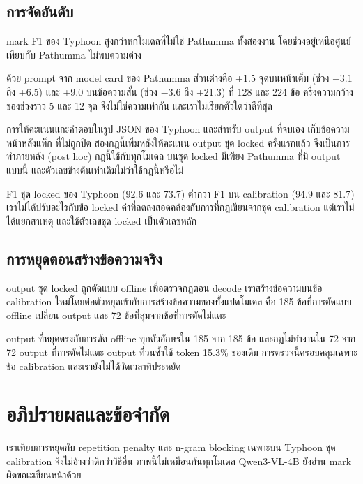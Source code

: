 \subsection{การจัดอันดับ}
mark F1 ของ Typhoon สูงกว่าหกโมเดลที่ไม่ใช่ Pathumma ทั้งสองงาน โดยช่วงอยู่เหนือศูนย์ เทียบกับ Pathumma ไม่พบความต่าง

ด้วย prompt จาก model card ของ Pathumma ส่วนต่างคือ +1.5 จุดบนหน้าเต็ม (ช่วง $-$3.1 ถึง +6.5) และ +9.0 บนข้อความสั้น (ช่วง $-$3.6 ถึง +21.3) ที่ 128 และ 224 ข้อ ครึ่งความกว้างของช่วงราว 5 และ 12 จุด จึงไม่ใช่ความเท่ากัน และเราไม่เรียกตัวใดว่าดีที่สุด

การให้คะแนนแกะคำตอบในรูป JSON ของ Typhoon และสำหรับ output ที่จบเอง เก็บข้อความหน้าหลังแท็ก  ที่ไม่ถูกปิด สองกฎนี้เพิ่มหลังให้คะแนน output ชุด locked ครั้งแรกแล้ว จึงเป็นการทำภายหลัง (post hoc) กฎนี้ใช้กับทุกโมเดล บนชุด locked มีเพียง Pathumma ที่มี output แบบนี้ และตัวเลขข้างต้นเท่าเดิมไม่ว่าใช้กฎนี้หรือไม่

F1 ชุด locked ของ Typhoon (92.6 และ 73.7) ต่ำกว่า F1 บน calibration (94.9 และ 81.7) เราไม่ได้ปรับอะไรกับข้อ locked ค่าที่ลดลงสอดคล้องกับการที่กฎเขียนจากชุด calibration แต่เราไม่ได้แยกสาเหตุ และใช้ตัวเลขชุด locked เป็นตัวเลขหลัก

\subsection{การหยุดตอนสร้างข้อความจริง}
output ชุด locked ถูกตัดแบบ offline เพื่อตรวจกฎตอน decode เราสร้างข้อความบนข้อ calibration ใหม่โดยต่อตัวหยุดเข้ากับการสร้างข้อความของทั้งแปดโมเดล คือ 185 ข้อที่การตัดแบบ offline เปลี่ยน output และ 72 ข้อที่สุ่มจากข้อที่การตัดไม่แตะ

output ที่หยุดตรงกับการตัด offline ทุกตัวอักษรใน 185 จาก 185 ข้อ และกฎไม่ทำงานใน 72 จาก 72 output ที่การตัดไม่แตะ output ที่วนซ้ำใช้ token 15.3\% ของเดิม การตรวจนี้ครอบคลุมเฉพาะข้อ calibration และเรายังไม่ได้วัดเวลาที่ประหยัด

\section{อภิปรายผลและข้อจำกัด}
เราเทียบการหยุดกับ repetition penalty และ n-gram blocking เฉพาะบน Typhoon ชุด calibration จึงไม่อ้างว่าดีกว่าวิธีอื่น ภาพนี้ไม่เหมือนกันทุกโมเดล Qwen3-VL-4B ยังอ่าน mark ผิดขณะเขียนหน้าด้วย

